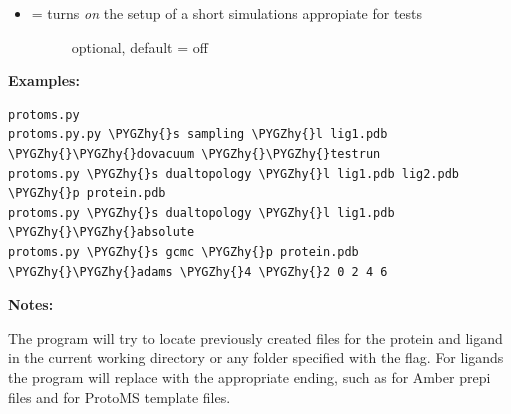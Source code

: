 \documentclass[letterpaper,10pt,english]{sphinxmanual}
\def\PYGZhy{\char`\-}
\begin{document}
\begin{itemize}
\begin{description}
\end{description}

\item {} \begin{description}
\item[{ = turns \emph{on} the setup of a short simulations appropiate for tests}] \leavevmode
optional, default = off

\end{description}

\end{itemize}

\textbf{Examples:}

\begin{Verbatim}[commandchars=\\\{\}]
protoms.py
protoms.py.py \PYGZhy{}s sampling \PYGZhy{}l lig1.pdb \PYGZhy{}\PYGZhy{}dovacuum \PYGZhy{}\PYGZhy{}testrun
protoms.py \PYGZhy{}s dualtopology \PYGZhy{}l lig1.pdb lig2.pdb \PYGZhy{}p protein.pdb
protoms.py \PYGZhy{}s dualtopology \PYGZhy{}l lig1.pdb \PYGZhy{}\PYGZhy{}absolute
protoms.py \PYGZhy{}s gcmc \PYGZhy{}p protein.pdb \PYGZhy{}\PYGZhy{}adams \PYGZhy{}4 \PYGZhy{}2 0 2 4 6
\end{Verbatim}

\textbf{Notes:}

The program will try to locate previously created files for the protein and ligand in the current working directory or any folder specified with the  flag. For ligands the program will replace  with the appropriate ending, such as  for Amber prepi files and  for ProtoMS template files.
\end{document}
